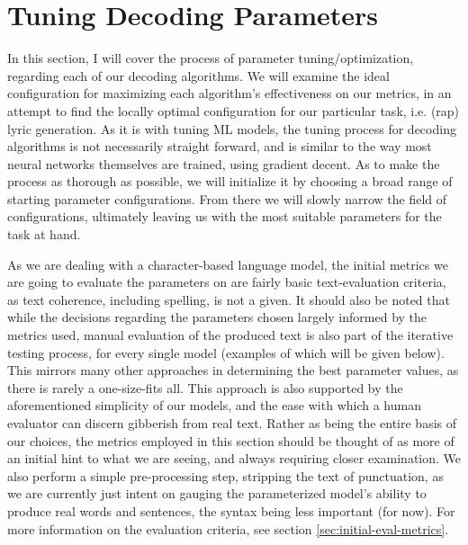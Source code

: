 \section{Tuning Decoding Parameters}
\label{chap:tuning-params}

In this section, I will cover the process of parameter tuning/optimization, regarding each of our decoding algorithms. We will examine the ideal configuration for maximizing each algorithm's effectiveness on our metrics, in an attempt to find the locally optimal configuration for our particular task, i.e. (rap) lyric generation. As it is with tuning ML models, the tuning process for decoding algorithms is not necessarily straight forward, and is similar to the way most neural networks themselves are trained, using gradient decent. As to make the process as thorough as possible, we will initialize it by choosing a broad range of starting parameter configurations. From there we will slowly narrow the field of configurations, ultimately leaving us with the most suitable parameters for the task at hand.

As we are dealing with a character-based language model, the initial metrics we are going to evaluate the parameters on are fairly basic text-evaluation criteria, as text coherence, including spelling, is not a given. It should also be noted that while the decisions regarding the parameters chosen largely informed by the metrics used, manual evaluation of the produced text is also part of the iterative testing process, for every single model (examples of which will be given below). This mirrors many other approaches in determining the best parameter values, as there is rarely a one-size-fits all. This approach is also supported by the aforementioned simplicity of our models, and the ease with which a human evaluator can discern gibberish from real text. Rather as being the entire basis of our choices, the metrics employed in this section should be thought of as more of an initial hint to what we are seeing, and always requiring closer examination. We also perform a simple pre-processing step, stripping the text of punctuation, as we are currently just intent on gauging the parameterized model’s ability to produce real words and sentences, the syntax being less important (for now). For more information on the evaluation criteria, see section \cref{sec:initial-eval-metrics}.

